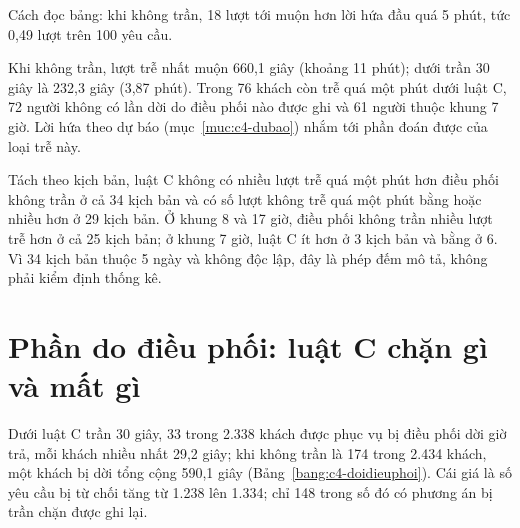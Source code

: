 Cách đọc bảng: khi không trần, 18 lượt tới muộn hơn lời hứa đầu quá 5 phút, tức 0,49 lượt trên 100 yêu cầu.

Khi không trần, lượt trễ nhất muộn 660,1 giây (khoảng 11 phút); dưới trần 30 giây là 232,3 giây (3,87 phút). Trong 76
khách còn trễ quá một phút dưới luật C, 72 người không có lần dời do điều phối nào được ghi và 61 người thuộc khung 7
giờ. Lời hứa theo dự báo (mục~\ref{muc:c4-dubao}) nhắm tới phần đoán được của loại trễ này.

Tách theo kịch bản, luật C không có nhiều lượt trễ quá một phút hơn điều phối không trần ở cả 34 kịch bản và có số
lượt không trễ quá một phút bằng hoặc nhiều hơn ở 29 kịch bản. Ở khung 8 và 17 giờ, điều phối không trần nhiều lượt
trễ hơn ở cả 25 kịch bản; ở khung 7 giờ, luật C ít hơn ở 3 kịch bản và bằng ở 6. Vì 34 kịch bản thuộc 5 ngày và không
độc lập, đây là phép đếm mô tả, không phải kiểm định thống kê.

\section{Phần do điều phối: luật C chặn gì và mất gì}
\label{muc:c4-dieuphoi}

Dưới luật C trần 30 giây, 33 trong 2.338 khách được phục vụ bị điều phối dời giờ trả, mỗi khách nhiều nhất 29,2 giây;
khi không trần là 174 trong 2.434 khách, một khách bị dời tổng cộng 590,1 giây (Bảng~\ref{bang:c4-doidieuphoi}). Cái
giá là số yêu cầu bị từ chối tăng từ 1.238 lên 1.334; chỉ 148 trong số đó có phương án bị trần chặn được ghi lại.


